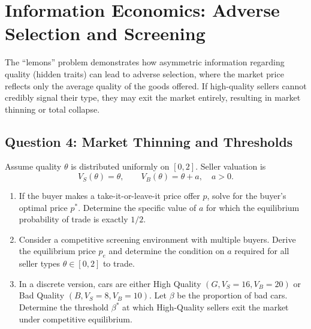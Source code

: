 \documentclass[12pt,a4paper]{article}
\begin{document}
\bigskip
\noindent\hrulefill
\bigskip


\section{Information Economics: Adverse Selection and Screening}

The ``lemons'' problem demonstrates how asymmetric information regarding quality (hidden traits)
can lead to adverse selection, where the market price reflects only the average quality of the
goods offered. If high-quality sellers cannot credibly signal their type, they may exit the market
entirely, resulting in market thinning or total collapse.

\subsection*{Question 4: Market Thinning and Thresholds}

Assume quality \(\theta\) is distributed uniformly on \([0,2]\). Seller valuation is
\[
  V_S(\theta) = \theta, \qquad
  V_B(\theta) = \theta + a, \quad a > 0.
\]

\begin{enumerate}
  \item If the buyer makes a take-it-or-leave-it price offer \(p\), solve for the buyer's optimal
        price \(p^*\). Determine the specific value of \(a\) for which the equilibrium probability
        of trade is exactly \(1/2\).
  \item Consider a competitive screening environment with multiple buyers. Derive the equilibrium
        price \(p_e\) and determine the condition on \(a\) required for all seller types
        \(\theta \in [0,2]\) to trade.
  \item In a discrete version, cars are either High Quality
        \((G, V_S = 16, V_B = 20)\) or Bad Quality \((B, V_S = 8, V_B = 10)\). Let \(\beta\) be
        the proportion of bad cars. Determine the threshold \(\beta^*\) at which High-Quality
        sellers exit the market under competitive equilibrium.
\end{enumerate}

\bigskip
\noindent\hrulefill
\bigskip

\end{document}
